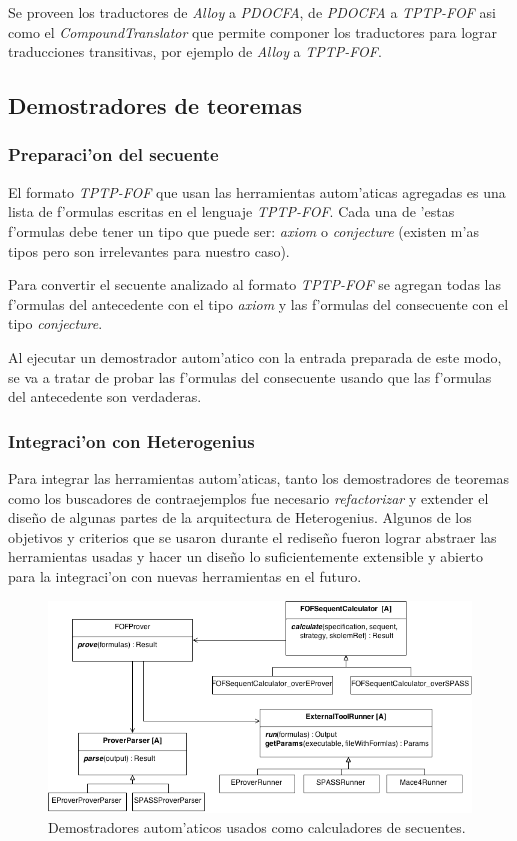 Se proveen los traductores de \textit{Alloy} a \textit{PDOCFA}, de \textit{PDOCFA} a \textit{TPTP-FOF} asi como el \textit{CompoundTranslator} que permite componer los traductores para lograr traducciones transitivas, por ejemplo de \textit{Alloy} a \textit{TPTP-FOF}.


\subsection{Demostradores de teoremas}

\subsubsection{Preparaci'on del secuente}

El formato \textit{TPTP-FOF} que usan las herramientas autom'aticas agregadas es una lista de f'ormulas escritas en el lenguaje \textit{TPTP-FOF}. Cada una de 'estas f'ormulas debe tener un tipo que puede ser: \textit{axiom} o \textit{conjecture} (existen m'as tipos pero son irrelevantes para nuestro caso).

Para convertir el secuente analizado al formato \textit{TPTP-FOF} se agregan todas las f'ormulas del antecedente con el tipo \textit{axiom} y las f'ormulas del consecuente con el tipo \textit{conjecture}. 

Al ejecutar un demostrador autom'atico con la entrada preparada de este modo, se va a tratar de probar las f'ormulas del consecuente usando que las f'ormulas del antecedente son verdaderas.


\subsubsection{Integraci'on con Heterogenius}

Para integrar las herramientas autom'aticas, tanto los demostradores de teoremas como los buscadores de contraejemplos fue necesario \textit{refactorizar} y extender el diseño de algunas partes de la arquitectura de Heterogenius. Algunos de los objetivos y criterios que se usaron durante el rediseño fueron lograr abstraer las herramientas usadas y hacer un diseño lo suficientemente extensible y abierto para la integraci'on con nuevas herramientas en el futuro.

\begin{figure}[H]
	\includegraphics[width=450px, angle=90]{img/arq_prover.png}
	\centering
	\caption{Demostradores autom'aticos usados como calculadores de secuentes.}
\end{figure}

